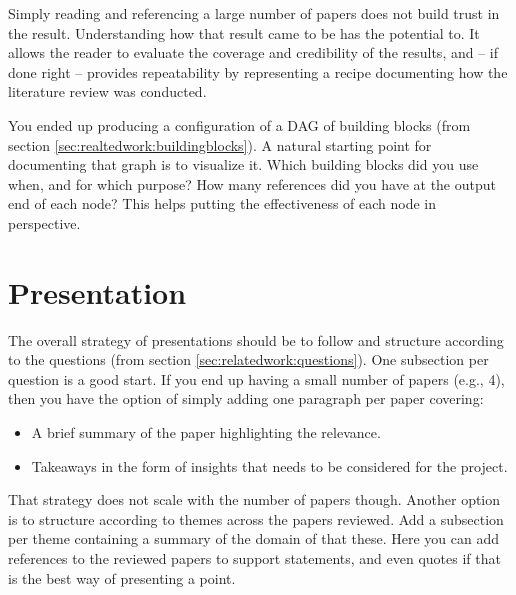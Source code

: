\documentclass[a4paper, oneside]{memoir}
\newcommand{\idx}[1]{\index{#1}\marginpar{\raggedright \tiny #1}}
\begin{document}
Simply reading and referencing a large number of papers does not build trust in the result. Understanding how that result came to be has the potential to. It allows the reader to evaluate the coverage and credibility of the results, and -- if done right -- provides repeatability by representing a recipe documenting how the literature review was conducted.

You ended up producing a configuration of a DAG\idx{DAG} of building blocks (from section \ref{sec:realtedwork:buildingblocks}). A natural starting point for documenting that graph is to visualize it. Which building blocks did you use when, and for which purpose? How many references did you have at the output end of each node? This helps putting the effectiveness of each node in perspective.

\section{Presentation}

The overall strategy of presentations should be to follow and structure according to the questions (from section \ref{sec:relatedwork:questions}). One subsection per question is a good start. If you end up having a small number of papers (e.g., 4), then you have the option of simply adding one paragraph per paper covering:
\begin{itemize}
  \item A brief summary of the paper highlighting the relevance.
  \item Takeaways in the form of insights that needs to be considered for the project.
\end{itemize}

That strategy does not scale with the number of papers though. Another option is to structure according to themes across the papers reviewed. Add a subsection per theme containing a summary of the domain of that these. Here you can add references to the reviewed papers to support statements, and even quotes if that is the best way of presenting a point.

\end{document}
